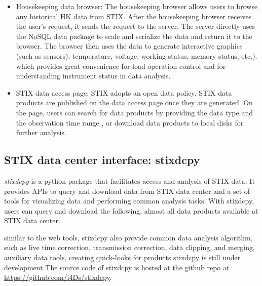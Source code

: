 \documentclass[referee]{aa} %
\begin{document}
\begin{itemize}
  \item  Housekeeping data browser: 
The housekeeping browser allows users to browse any historical HK data from STIX. After the housekeeping browser receives the user's request, it sends the request to the server. The server directly uses the NoSQL data package to scale and serialize the data and return it to the browser. The browser then uses the data to generate interactive graphics (such as sensors). 
temperature, voltage, working status, memory status, etc.).
which provides great convenience for load operation control and for understanding instrument status in data analysis.
\item STIX data access page:  
STIX adopts an open data policy. 
STIX data products are published on the data access page once they are generated. 
On the page, users can search for data products by providing the data type and the observation time range  
, or download data products to local disks for further analysis. 

\end{itemize}




\subsection{STIX data center interface:  stixdcpy}
{\it stixdcpy} is a python package that facilitates access and analysis of STIX data.
It provides APIs to query and download data from STIX data center 
 and a set of tools for visualizing data and performing common analysis tasks. 
 With stixdcpy, users can query and download the following,  almost all data products available at STIX data center. 

similar to the web tools, stixdcpy also provide common data analysis algorithm, such as 
live time correction, transmission correction, data clipping, and  merging, auxiliary data tools, 
creating quick-looks for products 
stixdcpy is still under  development 
The source code of stixdcpy is hosted at the github repo at  \url{https://github.com/i4Ds/stixdcpy}.
\end{document}
